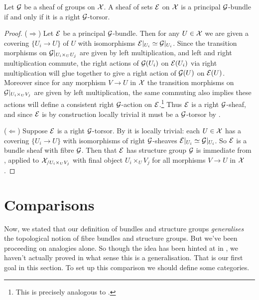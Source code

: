 \begin{proposition}
  \label{principal-equals-torsor}
  Let $\mathcal{G}$ be a sheaf of groups on $\mathcal{X}$. A sheaf of sets $\mathcal{E}$ on $\mathcal{X}$
  is a principal $\mathcal{G}$-bundle if and only if it is a right $\mathcal{G}$-torsor.
\end{proposition}

\begin{proof}
  ($\Rightarrow$) Let $\mathcal{E}$ be a principal $\mathcal{G}$-bundle. Then for any $U
  \in \mathcal{X}$ we are given a covering $\{U_i \to U\}$ of $U$ with
  isomorphisms $\mathcal{E}|_{U_i} \simeq \mathcal{G}|_{U_i}$. Since the transition
  morphisms on $\mathcal{G}|_{U_i \times_U U_j}$ are given by left
  multiplication, and left and right multiplication commute, the right
  actions of $\mathcal{G}(U_i)$ on $\mathcal{E}(U_i)$ via right multiplication will glue
  together to give a right action of $\mathcal{G}(U)$ on $\mathcal{E}(U)$. Moreover
  since for any morphism $V \to U$ in $\mathcal{X}$ the transition morphisms on
  $\mathcal{G}|_{U_i \times_U V_j}$ are given by left multiplication, the same
  commuting also implies these actions will define a consistent right
  $\mathcal{G}$-action on $\mathcal{E}$.\footnote{This is precisely analogous to
    .} Thus $\mathcal{E}$ is a right $\mathcal{G}$-sheaf,
  and since $\mathcal{E}$ is by construction locally trivial it must be a
  $\mathcal{G}$-torsor by .

  ($\Leftarrow$) Suppose $\mathcal{E}$ is a right $\mathcal{G}$-torsor. By
   it is locally trivial: each $U \in \mathcal{X}$ has a
  covering $\{U_i \to U\}$ with isomorphisms of right $\mathcal{G}$-sheaves
  $\mathcal{E}|_{U_i} \simeq \mathcal{G}|_{U_i}$. So $\mathcal{E}$ is a bundle sheaf with fibre
  $\mathcal{G}$. Then that $\mathcal{E}$ has structure group $\mathcal{G}$ is immediate from
  , applied to $\mathcal{X}_{/U_i \times_U V_j}$ with final
  object $U_i \times_U V_j$ for all morphisms $V \to U$ in $\mathcal{X}$.
\end{proof}


\section{Comparisons}

Now, we stated that our definition  of bundles and
structure groups \emph{generalises} the topological notion
 of fibre bundles and structure groups. But we've
been proceeding on analogies alone. So though the idea has been hinted
at in , we haven't actually proved in what sense
this is a generalisation. That is our first goal in this section. To
set up this comparison we should define some categories.

